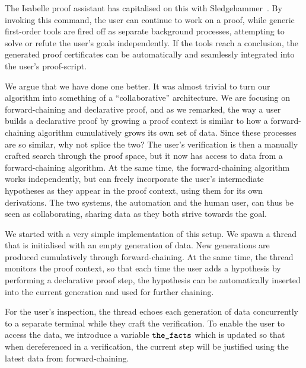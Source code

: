 The Isabelle proof assistant has capitalised on this with Sledgehammer~\cite{IsabelleSledgehammer}. By invoking this command, the user can continue to work on a proof, while generic first-order tools are fired off as separate background processes, attempting to solve or refute the user's goals independently. If the tools reach a conclusion, the generated proof certificates can be automatically and seamlessly integrated into the user's proof-script. 

We argue that we have done one better. It was almost trivial to turn our algorithm into something of a ``collaborative'' architecture. We are focusing on forward-chaining and declarative proof, and as we remarked, the way a user builds a declarative proof by growing a proof context is similar to how a forward-chaining algorithm cumulatively grows its own set of data. Since these processes are so similar, why not splice the two? The user's verification is then a manually crafted search through the proof space, but it now has access to data from a forward-chaining algorithm. At the same time, the forward-chaining algorithm works independently, but can freely incorporate the user's intermediate hypotheses as they appear in the proof context, using them for its own derivations. The two systems, the automation and the human user, can thus be seen as collaborating, sharing data as they both strive towards the goal. 

We started with a very simple implementation of this setup. We spawn a thread that is initialised with an empty generation of data. New generations are produced cumulatively through forward-chaining. At the same time, the thread monitors the proof context, so that each time the user adds a hypothesis by performing a declarative proof step, the hypothesis can be automatically inserted into the current generation and used for further chaining.

For the user's inspection, the thread echoes each generation of data concurrently to a separate terminal while they craft the verification. To enable the user to access the data, we introduce a variable $\texttt{the\_facts}$ which is updated so that when dereferenced in a verification, the current step will be justified using the latest data from forward-chaining. 


